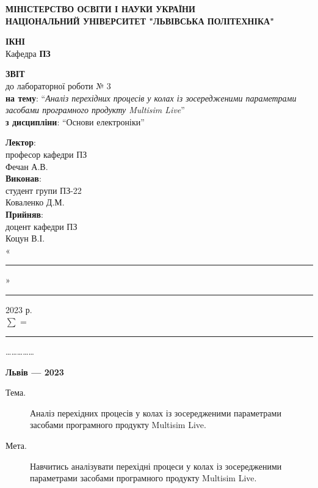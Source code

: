 \documentclass{article}
\newcommand\subject{Основи електроніки}
\newcommand\lecturer{професор кафедри ПЗ \\ Фечан А.В.}
\newcommand\teacher{доцент кафедри ПЗ \\ Коцун В.І.}
\newcommand\mygroup{ПЗ-22}
\newcommand\lab{3}
\newcommand\theme{Аналіз перехідних процесів у колах із зосередженими
	параметрами засобами програмного продукту Multisim Live}
\newcommand\purpose{Навчитись аналізувати перехідні процеси у колах із зосередженими
	параметрами засобами програмного продукту Multisim Live}
\begin{document}
\begin{normalsize}
	\begin{titlepage}
		\thispagestyle{empty}
		\begin{center}
			\textbf{МІНІСТЕРСТВО ОСВІТИ І НАУКИ УКРАЇНИ\\
				НАЦІОНАЛЬНИЙ УНІВЕРСИТЕТ "ЛЬВІВСЬКА ПОЛІТЕХНІКА"}
		\end{center}
		\begin{flushright}
			\textbf{ІКНІ}\\
			Кафедра \textbf{ПЗ}
		\end{flushright}
		\vspace{200pt}
		\begin{center}
			\textbf{ЗВІТ}\\
			\vspace{10pt}
			до лабораторної роботи № \lab\\
			\textbf{на тему}: “\textit{\theme}”\\
			\textbf{з дисципліни}: “\subject”
		\end{center}
		\vspace{112pt}
		\begin{flushright}
			
			\textbf{Лектор}:\\
			\lecturer\\
			\vspace{28pt}
			\textbf{Виконав}:\\
			
			студент групи \mygroup\\
			Коваленко Д.М.\\
			\vspace{28pt}
			\textbf{Прийняв}:\\
			
			\teacher\\
			
			\vspace{28pt}
			«\rule{1cm}{0.15mm}» \rule{1.5cm}{0.15mm} 2023 р.\\
			$\sum$ = \rule{1cm}{0.15mm}……………\\
			
		\end{flushright}
		\vspace{\fill}
		\begin{center}
			\textbf{Львів — 2023}
		\end{center}
	\end{titlepage}
		
	\begin{description}
		\item[Тема.] \theme.
		\item[Мета.] \purpose.
	\end{description}


\end{normalsize}
\end{document}
